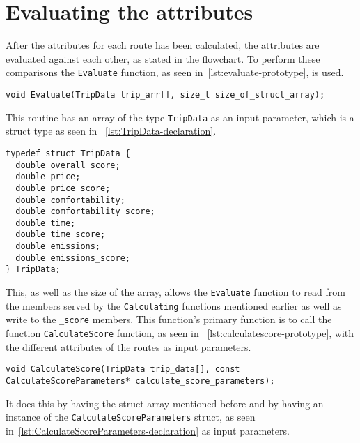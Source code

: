 \section{Evaluating the attributes}\label{sec:evaluating-the-attributes}

After the attributes for each route has been calculated, the attributes are evaluated against each other, as stated in
the flowchart.
To perform these comparisons the \texttt{Evaluate} function, as seen in~\ref{lst:evaluate-prototype}, is used.

\begin{lstlisting}[caption={Function prototype for \texttt{Evaluate}}, label={lst:evaluate-prototype}]
void Evaluate(TripData trip_arr[], size_t size_of_struct_array);
\end{lstlisting}

This routine has an array of the type \texttt{TripData} as an input parameter, which is a struct type as seen in
~\ref{lst:TripData-declaration}.

\begin{lstlisting}[caption={Declaration of \texttt{TripData} struct}, label={lst:TripData-declaration}]
typedef struct TripData {
  double overall_score;
  double price;
  double price_score;
  double comfortability;
  double comfortability_score;
  double time;
  double time_score;
  double emissions;
  double emissions_score;
} TripData;
\end{lstlisting}

This, as well as the size of the array, allows the \texttt{Evaluate} function to read from the members served by the
\texttt{Calculating} functions mentioned earlier as well as write to the \texttt{\_score} members.
This function's primary function is to call the function \texttt{CalculateScore} function, as seen in
~\ref{lst:calculatescore-prototype}, with the different attributes of the routes as input parameters.

\begin{lstlisting}[caption={Function prototype for \texttt{CalculateScore}}, label={lst:calculatescore-prototype}]
void CalculateScore(TripData trip_data[], const CalculateScoreParameters* calculate_score_parameters);
\end{lstlisting}

It does this by having the struct array mentioned before and by having an instance of the
\texttt{CalculateScoreParameters} struct, as seen in~\ref{lst:CalculateScoreParameters-declaration} as input parameters.

